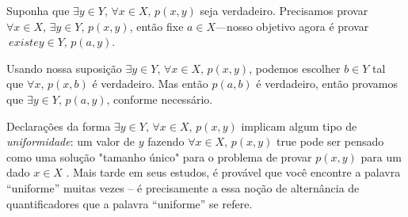 \begin{cproof}
Suponha que $\exists y \in Y,\, \forall x \in X,\, p(x,y)$ seja verdadeiro. Precisamos provar $\forall x \in X,\, \exists y \in Y,\, p(x,y)$, então fixe $a \in X$---nosso objetivo agora é provar $\ existe y \in Y,\, p(a,y)$.

Usando nossa suposição $\exists y \in Y,\, \forall x \in X,\, p(x,y)$, podemos escolher $b \in Y$ tal que $\forall x,\, p( x,b)$ é verdadeiro. Mas então $p(a, b)$ é verdadeiro, então provamos que $\exists y \in Y,\, p(a,y)$, conforme necessário.
\end{cproof}

Declarações da forma $\exists y \in Y,\, \forall x \in X,\, p(x,y)$ implicam algum tipo de \textit{uniformidade}: um valor de $y$ fazendo $\forall x \in X,\, p(x,y)$ true pode ser pensado como uma solução "tamanho único" para o problema de provar $p(x,y)$ para um dado $x \in X$ . Mais tarde em seus estudos, é provável que você encontre a palavra “uniforme” muitas vezes – é precisamente a essa noção de alternância de quantificadores que a palavra “uniforme” se refere.

